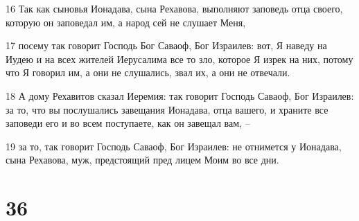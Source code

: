 \par 16 Так как сыновья Ионадава, сына Рехавова, выполняют заповедь отца своего, которую он заповедал им, а народ сей не слушает Меня,
\par 17 посему так говорит Господь Бог Саваоф, Бог Израилев: вот, Я наведу на Иудею и на всех жителей Иерусалима все то зло, которое Я изрек на них, потому что Я говорил им, а они не слушались, звал их, а они не отвечали.
\par 18 А дому Рехавитов сказал Иеремия: так говорит Господь Саваоф, Бог Израилев: за то, что вы послушались завещания Ионадава, отца вашего, и храните все заповеди его и во всем поступаете, как он завещал вам, --
\par 19 за то, так говорит Господь Саваоф, Бог Израилев: не отнимется у Ионадава, сына Рехавова, муж, предстоящий пред лицем Моим во все дни.

\chapter{36}

